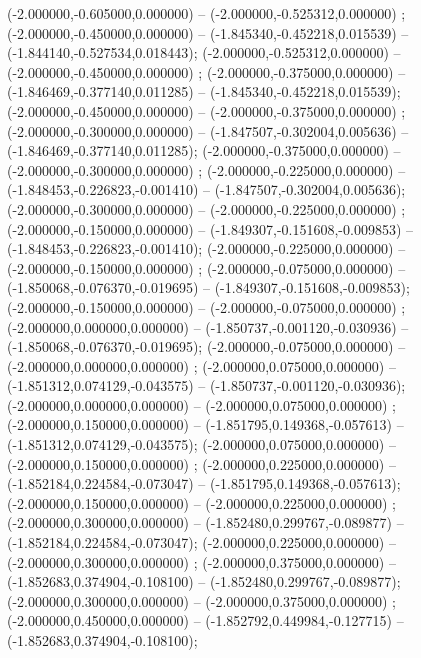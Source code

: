  (-2.000000,-0.605000,0.000000) -- (-2.000000,-0.525312,0.000000) ;
 (-2.000000,-0.450000,0.000000) -- (-1.845340,-0.452218,0.015539) -- (-1.844140,-0.527534,0.018443);
 (-2.000000,-0.525312,0.000000) -- (-2.000000,-0.450000,0.000000) ;
 (-2.000000,-0.375000,0.000000) -- (-1.846469,-0.377140,0.011285) -- (-1.845340,-0.452218,0.015539);
 (-2.000000,-0.450000,0.000000) -- (-2.000000,-0.375000,0.000000) ;
 (-2.000000,-0.300000,0.000000) -- (-1.847507,-0.302004,0.005636) -- (-1.846469,-0.377140,0.011285);
 (-2.000000,-0.375000,0.000000) -- (-2.000000,-0.300000,0.000000) ;
 (-2.000000,-0.225000,0.000000) -- (-1.848453,-0.226823,-0.001410) -- (-1.847507,-0.302004,0.005636);
 (-2.000000,-0.300000,0.000000) -- (-2.000000,-0.225000,0.000000) ;
 (-2.000000,-0.150000,0.000000) -- (-1.849307,-0.151608,-0.009853) -- (-1.848453,-0.226823,-0.001410);
 (-2.000000,-0.225000,0.000000) -- (-2.000000,-0.150000,0.000000) ;
 (-2.000000,-0.075000,0.000000) -- (-1.850068,-0.076370,-0.019695) -- (-1.849307,-0.151608,-0.009853);
 (-2.000000,-0.150000,0.000000) -- (-2.000000,-0.075000,0.000000) ;
 (-2.000000,0.000000,0.000000) -- (-1.850737,-0.001120,-0.030936) -- (-1.850068,-0.076370,-0.019695);
 (-2.000000,-0.075000,0.000000) -- (-2.000000,0.000000,0.000000) ;
 (-2.000000,0.075000,0.000000) -- (-1.851312,0.074129,-0.043575) -- (-1.850737,-0.001120,-0.030936);
 (-2.000000,0.000000,0.000000) -- (-2.000000,0.075000,0.000000) ;
 (-2.000000,0.150000,0.000000) -- (-1.851795,0.149368,-0.057613) -- (-1.851312,0.074129,-0.043575);
 (-2.000000,0.075000,0.000000) -- (-2.000000,0.150000,0.000000) ;
 (-2.000000,0.225000,0.000000) -- (-1.852184,0.224584,-0.073047) -- (-1.851795,0.149368,-0.057613);
 (-2.000000,0.150000,0.000000) -- (-2.000000,0.225000,0.000000) ;
 (-2.000000,0.300000,0.000000) -- (-1.852480,0.299767,-0.089877) -- (-1.852184,0.224584,-0.073047);
 (-2.000000,0.225000,0.000000) -- (-2.000000,0.300000,0.000000) ;
 (-2.000000,0.375000,0.000000) -- (-1.852683,0.374904,-0.108100) -- (-1.852480,0.299767,-0.089877);
 (-2.000000,0.300000,0.000000) -- (-2.000000,0.375000,0.000000) ;
 (-2.000000,0.450000,0.000000) -- (-1.852792,0.449984,-0.127715) -- (-1.852683,0.374904,-0.108100);
